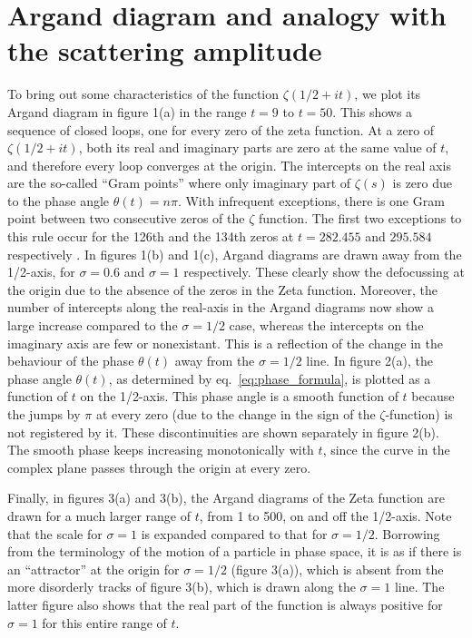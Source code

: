 \documentclass[11pt]{article}
\theoremstyle{plain}
\begin{document}
\section{Argand diagram and analogy with the scattering amplitude}

To bring out some characteristics of the function $\zeta(1/2 + it)$, we plot its Argand diagram in figure 1(a) in the range $t = 9$ to $t = 50$. This shows a sequence of closed loops, one for every zero of the zeta function. At a zero of $\zeta(1/2 + it)$, both its real and imaginary parts are zero at the same value of $t$, and therefore every loop converges at the origin. The intercepts on the real axis are the so-called ``Gram points'' where only imaginary part of $\zeta(s)$ is zero due to the phase angle $\theta(t) = n\pi$. With infrequent exceptions, there is one Gram point between two consecutive zeros of the $\zeta$ function. The first two exceptions to this rule occur for the 126th and the 134th zeros at $t = 282.455$ and $295.584$ respectively \cite{edwards1974}. In figures 1(b) and 1(c), Argand diagrams are drawn away from the 1/2-axis, for $\sigma = 0.6$ and $\sigma = 1$ respectively. These clearly show the defocussing at the origin due to the absence of the zeros in the Zeta function. Moreover, the number of intercepts along the real-axis in the Argand diagrams now show a large increase compared to the $\sigma = 1/2$ case, whereas the intercepts on the imaginary axis are few or nonexistant. This is a reflection of the change in the behaviour of the phase $\theta(t)$ away from the $\sigma = 1/2$ line. In figure 2(a), the phase angle $\theta(t)$, as determined by eq.~\eqref{eq:phase_formula}, is plotted as a function of $t$ on the 1/2-axis. This phase angle is a smooth function of $t$ because the jumps by $\pi$ at every zero (due to the change in the sign of the $\zeta$-function) is not registered by it. These discontinuities are shown separately in figure 2(b). The smooth phase keeps increasing monotonically with $t$, since the curve in the complex plane passes through the origin at every zero.

Finally, in figures 3(a) and 3(b), the Argand diagrams of the Zeta function are drawn for a much larger range of $t$, from 1 to 500, on and off the 1/2-axis. Note that the scale for $\sigma = 1$ is expanded compared to that for $\sigma = 1/2$. Borrowing from the terminology of the motion of a particle in phase space, it is as if there is an ``attractor'' at the origin for $\sigma = 1/2$ (figure 3(a)), which is absent from the more disorderly tracks of figure 3(b), which is drawn along the $\sigma = 1$ line. The latter figure also shows that the real part of the function is always positive for $\sigma = 1$ for this entire range of $t$.
\end{document}
